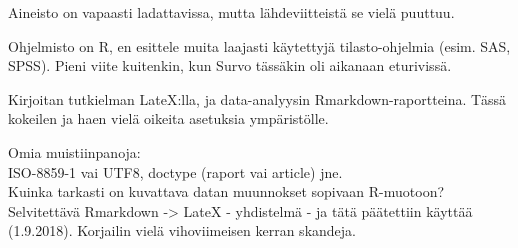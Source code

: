 Aineisto on vapaasti ladattavissa, mutta lähdeviitteistä se vielä puuttuu. 

Ohjelmisto on R, en esittele muita laajasti käytettyjä tilasto-ohjelmia (esim. SAS,
SPSS). Pieni viite kuitenkin, kun Survo tässäkin oli aikanaan eturivissä.

\bigskip

Kirjoitan tutkielman LateX:lla, ja data-analyysin Rmarkdown-raportteina. Tässä kokeilen ja haen vielä oikeita asetuksia ympäristölle.

\bigskip

Omia muistiinpanoja: \\

ISO-8859-1 vai UTF8, doctype (raport vai article) jne.\\

Kuinka tarkasti on kuvattava datan muunnokset sopivaan R-muotoon?\\

Selvitettävä Rmarkdown -> LateX - yhdistelmä - ja tätä päätettiin käyttää (1.9.2018). Korjailin vielä vihoviimeisen kerran skandeja.\\